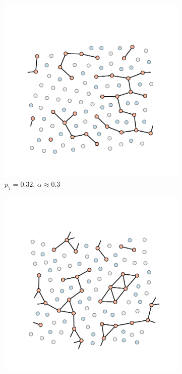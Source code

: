 \begin{figure}[bt]
     \vspace{0.2cm}
     \begin{subfigure}[b]{0.3\textwidth}
         \centering
         \includegraphics[width=\textwidth]{./figures/targeted_opt/percolation_alpha_3.pdf}
         \caption{$p_7=0.32$, $\alpha\approx0.3$}
         \label{fig:percalphaa}
     \end{subfigure}
     \hfill
      \begin{subfigure}[b]{0.3\textwidth}
         \centering
         \includegraphics[width=\textwidth]{./figures/targeted_opt/percolation_alpha_1.pdf}

\end{subfigure}
\end{figure}
